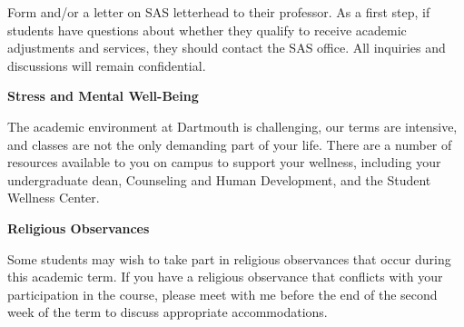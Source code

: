 \documentclass{article}
\begin{document}
    Form and/or a letter on SAS letterhead to their professor. As a first step,
    if students have questions about whether they qualify to receive academic
    adjustments and services, they should contact the SAS office. All inquiries
    and discussions will remain confidential.
    \par\hfill\par
    \textbf{Stress and Mental Well-Being}
    \par\hfill\par
    The academic environment at Dartmouth is challenging, our terms are
    intensive, and classes are not the only demanding part of your life. There
    are a number of resources available to you on campus to support your
    wellness, including your undergraduate dean, Counseling and Human
    Development, and the Student Wellness Center.
    \par\hfill\par
    \textbf{Religious Observances}
    \par\hfill\par
    Some students may wish to take part in religious observances that occur
    during this academic term. If you have a religious observance that
    conflicts with your participation in the course, please meet with me before
    the end of the second week of the term to discuss appropriate
    accommodations.
\end{document}
